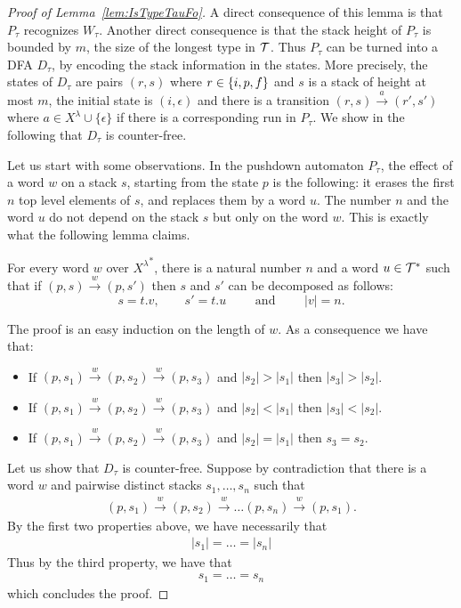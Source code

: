 \begin{proof}[Proof of Lemma~\ref{lem:IsTypeTauFo}]
A direct consequence of this lemma is that $P_\tau$ recognizes $W_\tau$. Another direct consequence is that the stack height of $P_\tau$ is bounded by $m$, the size of the longest type in ${\mathcal T}$. Thus $P_\tau$ can be turned into a DFA $D_\tau$, by encoding the stack information in the states. More precisely, the states of $D_\tau$ are pairs $(r,s)$ where $r\in \{i,p,f\}$ and $s$ is a stack of height at most $m$, the initial state is $(i,\epsilon)$ and there is a transition $(r,s)\xrightarrow{a}(r',s')$ where $a\in X^\lambda\cup\{\epsilon\}$ if there is a corresponding run in $P_\tau$. We show in the following that $D_\tau$ is counter-free. 

Let us start with some observations. In the pushdown automaton $P_\tau$, the effect of a word $w$ on a stack $s$, starting from the state $p$ is the following: it erases the first $n$ top level elements of $s$, and replaces them by a word $u$. The number $n$ and the word $u$ do not depend on the stack $s$ but only on the word $w$. This is exactly what the following lemma claims.

\begin{lemma}
For every word $w$ over ${X^\lambda}^*$, there is a natural number $n$ and a word $u\in {\mathcal T}^*$ such that if $(p,s)\xrightarrow{w}(p,s')$ then $s$ and $s'$ can be decomposed as follows:
$$s=t.v,\qquad s'=t.u\qquad \text{ and }\qquad |v|=n.$$
\end{lemma}
The proof is an easy induction on the length of $w$. As a consequence we have that:
\begin{itemize}
\item If $(p,s_1)\xrightarrow{w}(p,s_2)\xrightarrow{w}(p,s_3)$ and $|s_2|>|s_1|$ then $|s_3|>|s_2|$.
\item If $(p,s_1)\xrightarrow{w}(p,s_2)\xrightarrow{w}(p,s_3)$ and $|s_2|<|s_1|$ then $|s_3|<|s_2|$.
\item If $(p,s_1)\xrightarrow{w}(p,s_2)\xrightarrow{w}(p,s_3)$ and $|s_2|=|s_1|$ then $s_3 =s_2$.
\end{itemize}

Let us show that $D_\tau$ is counter-free. Suppose by contradiction that there is a word $w$ and pairwise distinct stacks $s_1,\dots, s_n$ such that 
\begin{align*}
(p,s_1)\xrightarrow{w}(p,s_2)\xrightarrow{w}\dots(p,s_n)\xrightarrow{w}(p,s_1).
\end{align*} 
By the first two properties above, we have necessarily that 
\begin{align*}
|s_1|=\dots=|s_n|
\end{align*}
 Thus by the third property, we have that 
\begin{align*}
 s_1=\dots=s_n
\end{align*} 
 which concludes the proof.
\end{proof}



